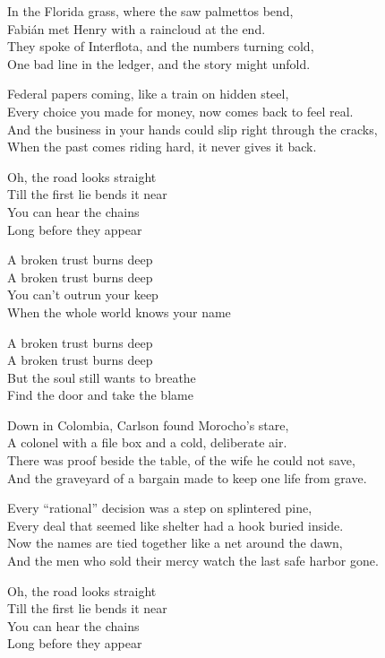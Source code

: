 \begin{lyrics}
In the Florida grass, where the saw palmettos bend,\\
Fabián met Henry with a raincloud at the end.\\
They spoke of Interflota, and the numbers turning cold,\\
One bad line in the ledger, and the story might unfold.

Federal papers coming, like a train on hidden steel,\\
Every choice you made for money, now comes back to feel real.\\
And the business in your hands could slip right through the cracks,\\
When the past comes riding hard, it never gives it back.

Oh, the road looks straight\\
Till the first lie bends it near\\
You can hear the chains\\
Long before they appear

A broken trust burns deep\\
A broken trust burns deep\\
You can’t outrun your keep\\
When the whole world knows your name

A broken trust burns deep\\
A broken trust burns deep\\
But the soul still wants to breathe\\
Find the door and take the blame

Down in Colombia, Carlson found Morocho’s stare,\\
A colonel with a file box and a cold, deliberate air.\\
There was proof beside the table, of the wife he could not save,\\
And the graveyard of a bargain made to keep one life from grave.

Every “rational” decision was a step on splintered pine,\\
Every deal that seemed like shelter had a hook buried inside.\\
Now the names are tied together like a net around the dawn,\\
And the men who sold their mercy watch the last safe harbor gone.

Oh, the road looks straight\\
Till the first lie bends it near\\
You can hear the chains\\
Long before they appear


\end{lyrics}
